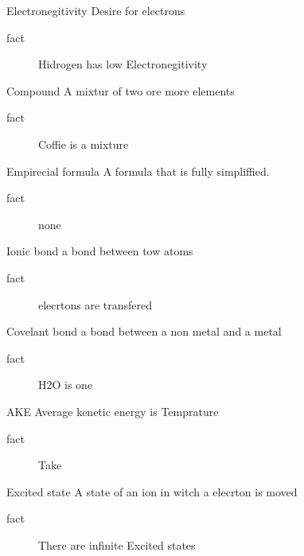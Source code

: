 \documentclass[avery5388,grid,frame]{flashcards}
\begin{document}
\begin{flashcard}[Definition]{Electronegitivity}
  Desire for electrons
  \begin{description}
    \item[fact] Hidrogen has low Electronegitivity
  \end{description}
\end{flashcard}

\begin{flashcard}[Definition]{Compound}
  A mixtur of two ore more elements
  \begin{description}
    \item[fact] Coffie is a mixture
  \end{description}
\end{flashcard}

\begin{flashcard}[Definition]{Empirecial formula}
  A formula that is fully simpliffied.
  \begin{description}
    \item[fact] none
  \end{description}
\end{flashcard}

\begin{flashcard}[Definition]{Ionic bond}
  a bond between tow atoms
  \begin{description}
    \item[fact] elecrtons are transfered 
  \end{description}
\end{flashcard}

\begin{flashcard}[Definition]{Covelant bond}
  a bond between a non metal and a metal
  \begin{description}
    \item[fact] H2O is one
  \end{description}
\end{flashcard}

\begin{flashcard}[Definition]{AKE}
  Average kenetic energy is Temprature
  \begin{description}
    \item[fact] Take
  \end{description}
\end{flashcard}

\begin{flashcard}[Definition]{Excited state}
  A state of an ion in witch a elecrton is moved
  \begin{description}
    \item[fact] There are infinite Excited states
  \end{description}
\end{flashcard}
\end{document}
